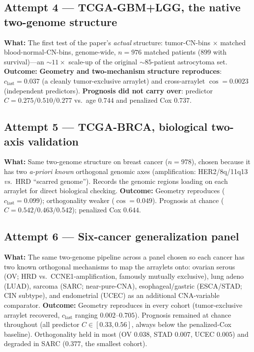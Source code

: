 \documentclass[11pt]{article}
\newcommand{\repro}{\textcolor{good}{\textbf{reproduces}}}
\newcommand{\notcarry}{\textcolor{gap}{\textbf{did not carry over}}}
\begin{document}
\subsection*{Attempt 4 --- TCGA-GBM+LGG, the native two-genome structure}
\textbf{What:} The first test of the paper's \emph{actual} structure:
tumor-CN-bins $\times$ matched blood-normal-CN-bins, genome-wide,
$n = 976$ matched patients ($899$ with survival)---an $\sim 11\times$ scale-up of
the original $\sim 85$-patient astrocytoma set.
\textbf{Outcome:} \textbf{Geometry and two-mechanism structure \repro{}}:
$c_{\text{last}} = 0.037$ (a cleanly tumor-exclusive arraylet) and
cross-arraylet $\cos = 0.0023$ (independent predictors). \textbf{Prognosis
\notcarry{}}: predictor $C = 0.275 / 0.510 / 0.277$ vs.\ age $0.744$ and
penalized Cox $0.737$.

\subsection*{Attempt 5 --- TCGA-BRCA, biological two-axis validation}
\textbf{What:} Same two-genome structure on breast cancer ($n = 978$), chosen
because it has two \emph{a-priori known} orthogonal genomic axes
(amplification: HER2/8q/11q13 \emph{vs.}\ HRD ``scarred genome''). Records the
genomic regions loading on each arraylet for direct biological checking.
\textbf{Outcome:} Geometry reproduces ($c_{\text{last}} = 0.099$); orthogonality
weaker ($\cos = 0.049$). Prognosis at chance ($C = 0.542 / 0.463 / 0.542$);
penalized Cox $0.644$.

\subsection*{Attempt 6 --- Six-cancer generalization panel}
\textbf{What:} The same two-genome pipeline across a panel chosen so each cancer
has two known orthogonal mechanisms to map the arraylets onto: ovarian serous
(OV; HRD vs.\ CCNE1-amplification, famously mutually exclusive), lung adeno
(LUAD), sarcoma (SARC; near-pure-CNA), esophageal/gastric (ESCA/STAD; CIN
subtype), and endometrial (UCEC) as an additional CNA-variable comparator.
\textbf{Outcome:} Geometry reproduces in every cohort (tumor-exclusive arraylet
recovered, $c_{\text{last}}$ ranging $0.002$--$0.705$). Prognosis remained at
chance throughout (all predictor $C \in [0.33, 0.56]$, always below the
penalized-Cox baseline). Orthogonality held in most (OV $0.038$, STAD $0.007$,
UCEC $0.005$) and degraded in SARC ($0.377$, the smallest cohort).
\end{document}
